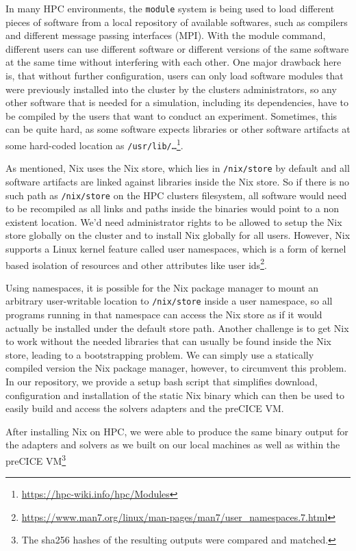 \documentclass[conference,final,a4paper]{IEEEtran}
\begin{document}
In many HPC environments, the \texttt{module} system is being used to load different pieces of software from a local repository of available softwares, such as compilers and different message passing interfaces (MPI).
With the module command, different users can use different software or different versions of the same software at the same time without interfering with each other.
One major drawback here is, that without further configuration, users can only load software modules that were previously installed into the cluster by the clusters administrators, so any other software that is needed for a simulation, including its dependencies, have to be compiled by the users that want to conduct an experiment.
Sometimes, this can be quite hard, as some software expects libraries or other software artifacts at some hard-coded location as \texttt{/usr/lib/\ldots}\footnote{\url{https://hpc-wiki.info/hpc/Modules}}.

As mentioned, Nix uses the Nix store, which lies in \texttt{/nix/store} by default and all software artifacts are linked against libraries inside the Nix store.
So if there is no such path as \texttt{/nix/store} on the HPC clusters filesystem, all software would need to be recompiled as all links and paths inside the binaries would point to a non existent location.
We'd need administrator rights to be allowed to setup the Nix store globally on the cluster and to install Nix globally for all users.
However, Nix supports a Linux kernel feature called user namespaces, which is a form of kernel based isolation of resources and other attributes like user ids\footnote{\url{https://www.man7.org/linux/man-pages/man7/user_namespaces.7.html}}.

Using namespaces, it is possible for the Nix package manager to mount an arbitrary user-writable location to \texttt{/nix/store} inside a user namespace, so all programs running in that namespace can access the Nix store as if it would actually be installed under the default store path.
Another challenge is to get Nix to work without the needed libraries that can usually be found inside the Nix store, leading to a bootstrapping problem.
We can simply use a statically compiled version the Nix package manager, however, to circumvent this problem.
In our repository, we provide a setup bash script that simplifies download, configuration and installation of the static Nix binary which can then be used to easily build and access the solvers adapters and the preCICE VM.

After installing Nix on HPC, we were able to produce the same binary output for the adapters and solvers as we built on our local machines as well as within the preCICE VM\footnote{The sha256 hashes of the resulting outputs were compared and matched.}
\end{document}
